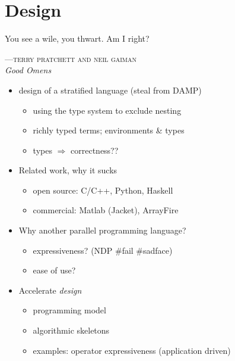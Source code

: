 
\chapter{Design}
\epigraph{You see a wile, you thwart. Am I right?}%
{\textsc{---terry pratchett and neil gaiman}\\\textit{Good Omens}}

\begin{itemize}
    \item design of a stratified language (steal from DAMP)
        \begin{itemize}
            \item using the type system to exclude nesting
            \item richly typed terms; environments \& types
            \item types $\Rightarrow$ correctness??
        \end{itemize}

    \item Related work, why it sucks
        \begin{itemize}
            \item open source: C/C++, Python, Haskell
            \item commercial: Matlab (Jacket), ArrayFire
        \end{itemize}

    \item Why another parallel programming language?
        \begin{itemize}
            \item expressiveness? (NDP \#fail \#sadface)
            \item ease of use?
        \end{itemize}

    \item Accelerate \textit{design}
        \begin{itemize}
            \item programming model
            \item algorithmic skeletons
            \item examples: operator expressiveness (application driven)
        \end{itemize}

\end{itemize}


